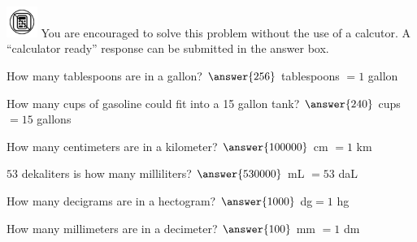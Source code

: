 \documentclass{ximera}
\author{David Kish}
\begin{document}
\includegraphics[width=1cm]{nocalc.png} You are encouraged to solve this problem without the use of a calcutor. A ``calculator ready'' response can be submitted in the answer box.
\begin{exercise}
 How many tablespoons are in a gallon? 
 $\answer{256}$ tablespoons $= 1$ gallon
 \end{exercise}
  \begin{exercise}
 How many cups of gasoline could fit into a 15 gallon tank?
 $\answer{240}$ cups $= 15$ gallons
 \end{exercise}
  \begin{exercise}
 How many centimeters are in a kilometer? 
 $\answer{100000}$ cm $= 1$ km
 \end{exercise}
   \begin{exercise}
 $53$ dekaliters is how many milliliters?
 $\answer{530000}$ mL $= 53$ daL
 \end{exercise}
   \begin{exercise}
 How many decigrams are in a hectogram? 
$ \answer{1000}$ dg$ = 1$ hg
 \end{exercise}
   \begin{exercise}
 How many millimeters are in a decimeter?
 $\answer{100}$ mm $= 1$ dm
 \end{exercise}
\end{document}
